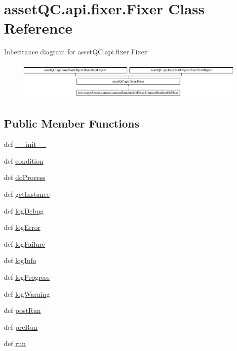 \hypertarget{classassetQC_1_1api_1_1fixer_1_1Fixer}{\section{asset\-Q\-C.\-api.\-fixer.\-Fixer \-Class \-Reference}
\label{d7/da8/classassetQC_1_1api_1_1fixer_1_1Fixer}
}
\-Inheritance diagram for asset\-Q\-C.\-api.\-fixer.\-Fixer\-:\begin{figure}[H]
\begin{center}
\leavevmode
\includegraphics[height=1.917808cm]{d7/da8/classassetQC_1_1api_1_1fixer_1_1Fixer}
\end{center}
\end{figure}
\subsection*{\-Public \-Member \-Functions}
\begin{DoxyCompactItemize}
\item 
def \hyperlink{classassetQC_1_1api_1_1fixer_1_1Fixer_aa90073f50820adace2f152ac03672ddb}{\-\_\-\-\_\-init\-\_\-\-\_\-}
\item 
def \hyperlink{classassetQC_1_1api_1_1fixer_1_1Fixer_aa7b2d770258ea6e4207cb2adac37ffd2}{condition}
\item 
def \hyperlink{classassetQC_1_1api_1_1fixer_1_1Fixer_aba694e79a4674147b3414e4780611906}{do\-Process}
\item 
def \hyperlink{classassetQC_1_1api_1_1fixer_1_1Fixer_af50455a792a5e634310ae149e74f1533}{get\-Instance}
\item 
def \hyperlink{classassetQC_1_1api_1_1fixer_1_1Fixer_ad12ab9e6ca73ee1a33407419700c4e58}{log\-Debug}
\item 
def \hyperlink{classassetQC_1_1api_1_1fixer_1_1Fixer_ac05a3b6daa78e4501096581c42259339}{log\-Error}
\item 
def \hyperlink{classassetQC_1_1api_1_1fixer_1_1Fixer_a5506fbbba625ea7b4acd33c5f8f1518e}{log\-Failure}
\item 
def \hyperlink{classassetQC_1_1api_1_1fixer_1_1Fixer_a69002e8c6212776b265fca8834e6fbe1}{log\-Info}
\item 
def \hyperlink{classassetQC_1_1api_1_1fixer_1_1Fixer_ae400dd96795e72b7f3c34fce10536f34}{log\-Progress}
\item 
def \hyperlink{classassetQC_1_1api_1_1fixer_1_1Fixer_acdc4fc33ca1d605123c79f873341ddaa}{log\-Warning}
\item 
def \hyperlink{classassetQC_1_1api_1_1fixer_1_1Fixer_a922972ee4199fa94af0efb3746b90be2}{post\-Run}
\item 
def \hyperlink{classassetQC_1_1api_1_1fixer_1_1Fixer_a599b02aec5058d717de4f3742e544662}{pre\-Run}
\item 
def \hyperlink{classassetQC_1_1api_1_1fixer_1_1Fixer_a402e3fb543f90b311dad855982172e8f}{run}
\end{DoxyCompactItemize}
